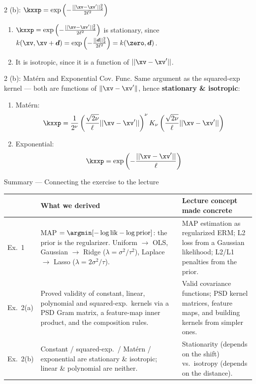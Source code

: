 \documentclass[aspectratio=169]{beamer}
\newcommand{\xvp}{\xv^\prime}
\newcommand{\dv}{\bm{d}}
\begin{document}
\begin{frame}[t]{2 (b): $\kxxp = \exp\left( - \frac{||\xv - \xvp||_2^2}{2 \ell^2}\right)$}
	\begin{enumerate}
		\item<1-> $\kxxp = \exp\left( - \frac{||\xv - \xvp||_2^2}{2 \ell^2}\right)$ is stationary, since $k(\xv, \xv + \dv) = \exp \left( - \frac{||\dv||_2^2}{2 \ell^2} \right) = k(\zero, \dv)$.
		\item<2-> It is isotropic, since it is a function of $||\xv - \xvp||$.
	\end{enumerate}
\end{frame}

\begin{frame}[t]{2 (b): Mat\'ern and Exponential Cov. Func.}
	Same argument as the squared-exp kernel --- both are functions of $\|\xv - \xvp\|$, hence \textbf{stationary \& isotropic}:
	\begin{enumerate}
		\item Mat\'ern:
		$$\kxxp = \frac{1}{2^\nu} \left( \frac{\sqrt{2 \nu}}{\ell} || \xv - \xvp|| \right)^\nu K_\nu \left( \frac{\sqrt{2 \nu}}{\ell} || \xv - \xvp|| \right)$$
		\item Exponential:
		$$\kxxp = \exp \left( - \frac{||\xv - \xvp ||}{\ell} \right)$$
	\end{enumerate}
\end{frame}

\begin{frame}{Summary --- Connecting the exercise to the lecture}
	\footnotesize
	\begin{center}
	\renewcommand{\arraystretch}{1.15}
	\begin{tabular}{@{}>{\raggedright\arraybackslash}p{}>{\raggedright\arraybackslash}p{}>{\raggedright\arraybackslash}p{}@{}}
		\toprule
		& \textbf{What we derived} & \textbf{Lecture concept made concrete} \\
		\midrule
		Ex.\ 1 &
			MAP $= \argmin[-\log\text{lik} - \log\text{prior}]$: the prior is the regularizer. Uniform $\to$ OLS, Gaussian $\to$ Ridge ($\lambda=\sigma^2/\tau^2$), Laplace $\to$ Lasso ($\lambda=2\sigma^2/\tau$). &
			MAP estimation as regularized ERM; L2 loss from a Gaussian likelihood; L2/L1 penalties from the prior. \\
		Ex.\ 2(a) &
			Proved validity of constant, linear, polynomial and squared-exp.\ kernels via a PSD Gram matrix, a feature-map inner product, and the composition rules. &
			Valid covariance functions; PSD kernel matrices, feature maps, and building kernels from simpler ones. \\
		Ex.\ 2(b) &
			Constant / squared-exp.\ / Mat\'ern / exponential are stationary \& isotropic; linear \& polynomial are neither. &
			Stationarity (depends on the shift) vs.\ isotropy (depends on the distance). \\
		\bottomrule
	\end{tabular}
	\end{center}
\end{frame}
\end{document}
